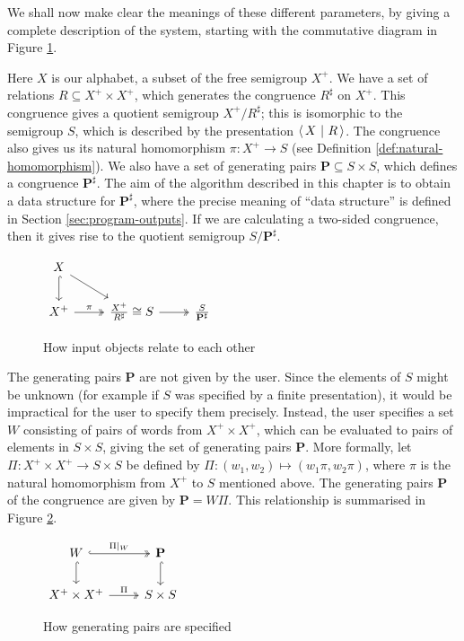 We shall now make clear the meanings of these different parameters, by giving a
complete description of the system, starting with the commutative diagram in
Figure \ref{fig:pairs-cd-1}.

Here $X$ is our alphabet, a subset of the free semigroup $X^+$.  We have a set
of relations $R \subseteq X^+ \times X^+$, which generates the congruence
$R^\sharp$ on $X^+$.  This congruence gives a quotient semigroup
$X^+ / R^\sharp$; this is isomorphic to the semigroup $S$,
which is described by the presentation $\left\langle\,X ~\middle|~ R\,\right\rangle$.  The
congruence also gives us its natural homomorphism $\pi: X^+ \to S$ (see
Definition \ref{def:natural-homomorphism}).  We also have a set of generating pairs
$\mathbf{P} \subseteq S \times S$, which defines a congruence
$\mathbf{P}^\sharp$.  The aim of the algorithm described in this chapter is to
obtain a data structure for $\mathbf{P}^\sharp$, where the precise meaning of
``data structure'' is defined in Section \ref{sec:program-outputs}.  If we are
calculating a two-sided congruence, then it gives rise to the
quotient semigroup $S / \mathbf{P}^\sharp$.

\begin{figure}[h]
  \centering
  $\begin{tikzcd}
    X \arrow[dr] \arrow[d, hook] & \\
    X^+ \arrow[r, two heads, "\pi"] & \frac{X^+}{R^\sharp} \cong S \arrow[r, two heads] & \frac{S}{\mathbf{P}^\sharp}
  \end{tikzcd}$
  \caption{How input objects relate to each other}
  \label{fig:pairs-cd-1}
\end{figure}

The generating pairs $\mathbf{P}$ are not given by the user.  Since the elements
of $S$ might be unknown (for example if $S$ was specified by a finite
presentation), it would be impractical for the user to specify them precisely.
Instead, the user specifies a set $W$ consisting of pairs of words from
$X^+ \times X^+$, which can be evaluated to pairs of elements in $S \times S$,
giving the set of generating pairs $\mathbf{P}$.
More formally, let
$\Pi: X^+ \times X^+ \to S \times S$ be defined by
$\Pi: (w_1, w_2) \mapsto (w_1\pi, w_2\pi)$, where $\pi$ is the natural
homomorphism from $X^+$ to $S$ mentioned above.  The generating pairs
$\mathbf{P}$ of the congruence are given by $\mathbf{P} = W \Pi$.
This relationship is summarised in Figure \ref{fig:pairs-cd-2}.

\begin{figure}[h]
  \centering
  $\begin{tikzcd}
    W \arrow[r, hook, two heads, "\Pi|_W"] \arrow[d, hook] & \mathbf{P} \arrow[d, hook] \\
    X^+ \times X^+ \arrow[r, two heads, "\Pi"] & S \times S
  \end{tikzcd}$
  \caption{How generating pairs are specified}
  \label{fig:pairs-cd-2}
\end{figure}

